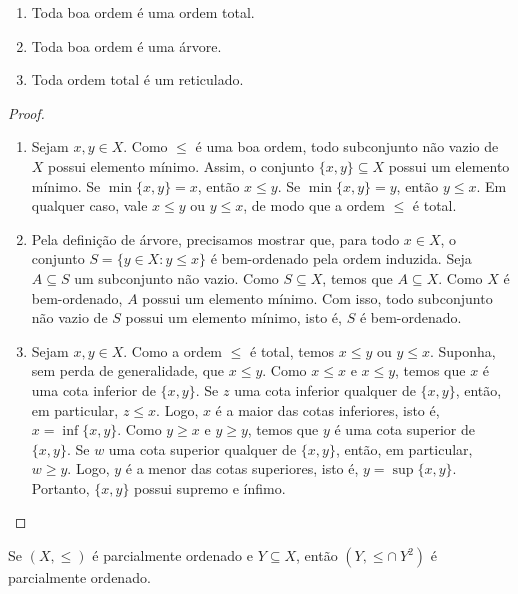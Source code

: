 \begin{proposition}
    \leavevmode
        \begin{enumerate}[leftmargin=*, align=left, label=\textbf{(\alph*)}]
            \item Toda boa ordem é uma ordem total.
            \item Toda boa ordem é uma árvore.
            \item Toda ordem total é um reticulado.
        \end{enumerate}
\end{proposition}

\begin{proof}
    \leavevmode
        \begin{enumerate}[leftmargin=*, align=left, label=\textbf{(\alph*)}]
            \item Sejam $x, y \in X$. Como $\leq$ é uma boa ordem, todo subconjunto não vazio de $X$ possui elemento mínimo. Assim, o conjunto $\{x,y\} \subseteq X$ possui um elemento mínimo. Se $\min\{x,y\} = x$, então $x \leq y$. Se $\min\{x,y\} = y$, então $y \leq x$. Em qualquer caso, vale $x \leq y$ ou $y \leq x$, de modo que a ordem $\leq$ é total. \blackproof
            \item Pela definição de árvore, precisamos mostrar que, para todo $x \in X$, o conjunto $S = \{ y \in X : y \leq x\}$ é bem-ordenado pela ordem induzida. Seja $A \subseteq S$ um subconjunto não vazio. Como $S \subseteq X$, temos que $A \subseteq X$. Como $X$ é bem-ordenado, $A$ possui um elemento mínimo. Com isso, todo subconjunto não vazio de $S$ possui um elemento mínimo, isto é, $S$ é bem-ordenado. \blackproof
            \item Sejam $x, y \in X$. Como a ordem $\leq$ é total, temos $x \leq y$ ou $y \leq x$. Suponha, sem perda de generalidade, que $x \leq y$. Como $x \leq x$ e $x \leq y$, temos que $x$ é uma cota inferior de $\{x,y\}$. Se $z$ uma cota inferior qualquer de $\{x,y\}$, então, em particular, $z \leq x$. Logo, $x$ é a maior das cotas inferiores, isto é, $x = \inf\{x,y\}$. Como $y \geq x$ e $y \geq y$, temos que $y$ é uma cota superior de $\{x,y\}$. Se $w$ uma cota superior qualquer de $\{x,y \}$, então, em particular, $w \geq y$. Logo, $y$ é a menor das cotas superiores, isto é, $y = \sup\{x,y\}$. Portanto, $\{x,y\}$ possui supremo e ínfimo. \blackproof
        \end{enumerate}
\end{proof}

\begin{proposition}
    Se $(X,\leq)$ é parcialmente ordenado e $Y \subseteq X$, então $(Y, \leq \cap \ Y^2)$ é parcialmente ordenado.
\end{proposition}

